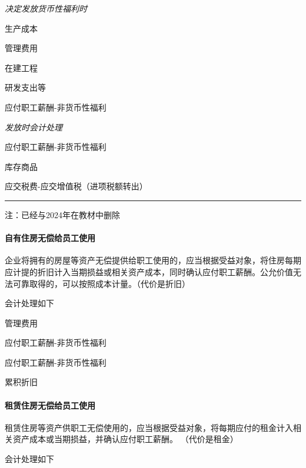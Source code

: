 \documentclass[UTF8,12pt]{ctexart}
\newenvironment{Dr}{%
	\begin{list}{}%
		{
			\setlength{\leftmargin}{2em}
			\setlength{\labelwidth}{2em}
			\setlength{\labelsep}{0pt}
			\setlength{\itemindent}{0pt}
			\setlength{\listparindent}{0pt}
			\setlength{\parsep}{0pt}
			\setlength{\topsep}{0pt}
		}
		\item[\textbf{借：}]
	}{%
	\end{list}
}
\newenvironment{Cr}{%
	\begin{list}{}%
		{
			\setlength{\leftmargin}{3em}
			\setlength{\labelwidth}{2em}
			\setlength{\labelsep}{0pt}
			\setlength{\itemindent}{0pt}
			\setlength{\listparindent}{0pt}
			\setlength{\parsep}{0pt}
			\setlength{\topsep}{0pt}
		}
		\item[\textbf{贷：}]
	}{%
	\end{list}
}
\numberwithin{equation}{section} %
\numberwithin{figure}{section}
\numberwithin{table}{section}
\begin{document}
	\textit{决定发放货币性福利时}
	
	\begin{Dr}
		生产成本
		
		管理费用
		
		在建工程
		
		研发支出等
	\end{Dr}
	\begin{Cr}
		应付职工薪酬-非货币性福利
	\end{Cr}

	\textit{发放时会计处理}
	
	\begin{Dr}
		应付职工薪酬-非货币性福利
	\end{Dr}
	\begin{Cr}
		库存商品
		
		应交税费-应交增值税（进项税额转出）
	\end{Cr}

	\vspace{5pt}
	\hrule
	\vspace{5pt}
	注：已经与2024年在教材中删除

	\paragraph{自有住房无偿给员工使用}
	企业将拥有的房屋等资产无偿提供给职工使用的，应当根据受益对象，将住房每期应计提的折旧计入当期损益或相关资产成本，同时确认应付职工薪酬。公允价值无法可靠取得的，可以按照成本计量。（代价是折旧）
	
	会计处理如下
	
	\begin{Dr}
		管理费用
	\end{Dr}
	\begin{Cr}
		应付职工薪酬-非货币性福利
	\end{Cr}

	\begin{Dr}
		应付职工薪酬-非货币性福利
	\end{Dr}
	\begin{Cr}
		累积折旧
	\end{Cr}
	
	
	\paragraph{租赁住房无偿给员工使用}
	租赁住房等资产供职工无偿使用的，应当根据受益对象，将每期应付的租金计入相关资产成本或当期损益，并确认应付职工薪酬。
	（代价是租金）
	
	会计处理如下
	
\end{document}
